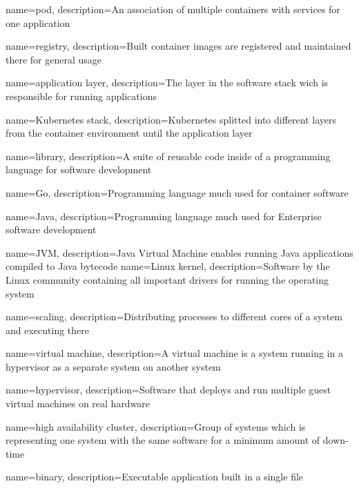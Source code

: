 {
    name={pod},
    description={An association of multiple containers with services for one application}
}

{
    name={registry},
    description={Built container images are registered and maintained there for general usage}
}

{
    name={application layer},
    description={The layer in the software stack wich is responsible for running applications}
}

{
    name={Kubernetes stack},
    description={Kubernetes splitted into different layers from the container environment until the application layer}
}

{
    name={library},
    description={A suite of reusable code inside of a programming language for software development}
}

{
    name={Go},
    description={Programming language much used for container software}
}

{
    name={Java},
    description={Programming language much used for Enterprise software development}
}

{
    name={JVM},
    description={Java Virtual Machine enables running Java applications compiled to Java bytecode}
}
{
    name={Linux kernel},
    description={Software by the Linux community containing all important drivers for running the operating system}
}

{
    name={scaling},
    description={Distributing processes to different cores of a system and executing there}
}

{
    name={virtual machine},
    description={A virtual machine is a system running in a hypervisor as a separate system on another system}
}

{
    name={hypervisor},
    description={Software that deploys and run multiple guest virtual machines on real hardware}
}

{
    name={high availability cluster},
    description={Group of systems which is representing one system with the same software for a minimum amount of down-time}
}

{
    name={binary},
    description={Executable application built in a single file}
}

